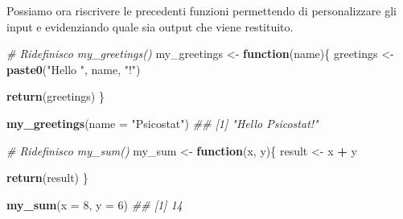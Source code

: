 \documentclass[
]{book}
\newenvironment{Shaded}{\begin{snugshade}}{\end{snugshade}}
\newcommand{\CommentTok}[1]{\textcolor[rgb]{0.56,0.35,0.01}{\textit{#1}}}
\newcommand{\ControlFlowTok}[1]{\textcolor[rgb]{0.13,0.29,0.53}{\textbf{#1}}}
\newcommand{\DataTypeTok}[1]{\textcolor[rgb]{0.13,0.29,0.53}{#1}}
\newcommand{\DecValTok}[1]{\textcolor[rgb]{0.00,0.00,0.81}{#1}}
\newcommand{\KeywordTok}[1]{\textcolor[rgb]{0.13,0.29,0.53}{\textbf{#1}}}
\newcommand{\NormalTok}[1]{#1}
\newcommand{\OperatorTok}[1]{\textcolor[rgb]{0.81,0.36,0.00}{\textbf{#1}}}
\newcommand{\StringTok}[1]{\textcolor[rgb]{0.31,0.60,0.02}{#1}}
\begin{document}
Possiamo ora riscrivere le precedenti funzioni permettendo di personalizzare gli input e evidenziando quale sia output che viene restituito.

\begin{Shaded}
\begin{Highlighting}[]
\CommentTok{# Ridefinisco my_greetings()}
\NormalTok{my_greetings <-}\StringTok{ }\ControlFlowTok{function}\NormalTok{(name)\{}
\NormalTok{  greetings <-}\StringTok{ }\KeywordTok{paste0}\NormalTok{(}\StringTok{"Hello "}\NormalTok{, name, }\StringTok{"!"}\NormalTok{)}
  
  \KeywordTok{return}\NormalTok{(greetings)}
\NormalTok{\}}

\KeywordTok{my_greetings}\NormalTok{(}\DataTypeTok{name =} \StringTok{"Psicostat"}\NormalTok{)}
\CommentTok{## [1] "Hello Psicostat!"}

\CommentTok{# Ridefinisco my_sum()}
\NormalTok{my_sum <-}\StringTok{ }\ControlFlowTok{function}\NormalTok{(x, y)\{}
\NormalTok{  result <-}\StringTok{ }\NormalTok{x }\OperatorTok{+}\StringTok{ }\NormalTok{y}
  
  \KeywordTok{return}\NormalTok{(result)}
\NormalTok{\}}

\KeywordTok{my_sum}\NormalTok{(}\DataTypeTok{x =} \DecValTok{8}\NormalTok{, }\DataTypeTok{y =} \DecValTok{6}\NormalTok{)}
\CommentTok{## [1] 14}
\end{Highlighting}
\end{Shaded}
\end{document}
